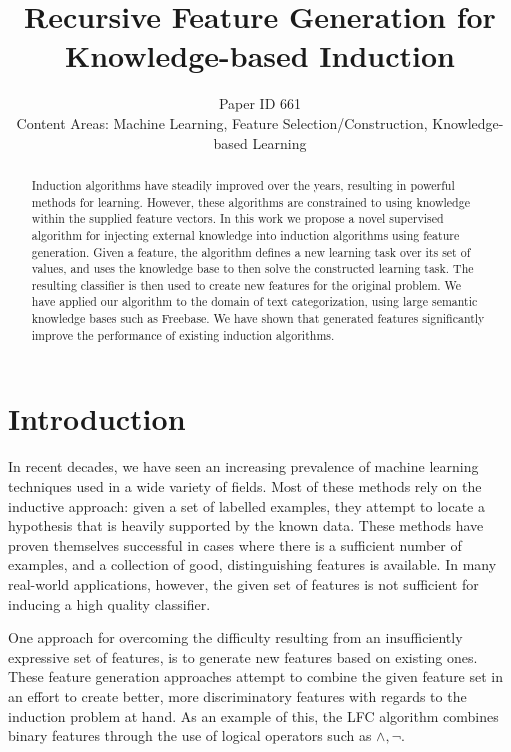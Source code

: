 \documentclass{article}
\title{Recursive Feature Generation for Knowledge-based Induction}
\author{Paper ID 661 \\
		Content Areas: Machine Learning, Feature Selection/Construction, Knowledge-based Learning
	}
\theoremstyle{definition}
\begin{document}
	
\maketitle
	
\begin{abstract}
	Induction algorithms have steadily improved over the years, resulting in powerful methods for learning. However, these algorithms are constrained to using knowledge within the supplied feature vectors. %
	In this work we propose a novel supervised algorithm for injecting external knowledge into induction algorithms using feature generation. Given a feature, the algorithm defines a new learning task over its set of values, and uses the knowledge base to then solve the constructed learning task. The resulting classifier is then used to create new features for the original problem.
	We have applied our algorithm to the domain of text categorization, using large semantic knowledge bases such as Freebase. We have shown that generated features significantly improve the performance of existing induction algorithms.
\end{abstract}

\section{Introduction}
\label{sec:Intro}
In recent decades, we have seen an increasing prevalence of machine learning techniques used in a wide variety of fields. %
Most of these methods rely on the inductive approach: given a set of labelled examples, they attempt to locate a hypothesis that is heavily supported by the known data. These methods have proven themselves successful in cases where there is a sufficient number of examples, and a collection of good,
distinguishing features is available.
In many real-world applications, however, the given set of features is not sufficient for inducing a high quality classifier.

One approach for overcoming the difficulty resulting from an insufficiently expressive set of features, is to generate new features based on existing ones. 
These feature generation approaches attempt to combine the given feature set in an effort to create better, more discriminatory features with regards to the induction problem at hand. As an example of this, the LFC algorithm \citep{ragavan1993complex} combines binary features through the use of logical operators such as $\land ,\lnot$.
\end{document}
